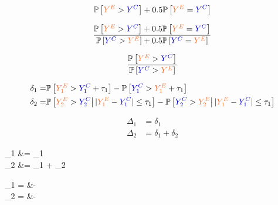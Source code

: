 \documentclass[12pt]{article}
\theoremstyle{definition}
\newcommand{\darkgreen}{green!70!black}
\newcommand{\darkblue}{blue!80!black}
\begin{document}
\begin{align*}
	\mathbb{P}\left[\textcolor{Orange}{Y^E}>\textcolor{\darkblue}{Y^C}\right]+0.5\mathbb{P}\left[\textcolor{Orange}{Y^E}=\textcolor{\darkblue}{Y^C}\right]
\end{align*}

\begin{align*}
	\frac{\mathbb{P}\left[\textcolor{Orange}{Y^E}>\textcolor{\darkblue}{Y^C}\right]+0.5\mathbb{P}\left[\textcolor{Orange}{Y^E}=\textcolor{\darkblue}{Y^C}\right]}{
	\mathbb{P}\left[\textcolor{\darkblue}{Y^C}>\textcolor{Orange}{Y^E}\right]+0.5\mathbb{P}\left[\textcolor{\darkblue}{Y^C}=\textcolor{Orange}{Y^E}\right]}
\end{align*}

\begin{align*}
	\frac{\mathbb{P}\left[\textcolor{Orange}{Y^E}>\textcolor{\darkblue}{Y^C}\right]}{\mathbb{P}\left[\textcolor{\darkblue}{Y^C}>\textcolor{Orange}{Y^E}\right]}
\end{align*}


\begin{align*}
	\delta_1 = &\mathbb{P}\left[\textcolor{Orange}{Y_1^E}>\textcolor{\darkblue}{Y_1^C}+\tau_1\right]-\mathbb{P}\left[\textcolor{\darkblue}{Y_1^C}>\textcolor{Orange}{Y_1^E}+\tau_1\right] \\
	\delta_2 = &\mathbb{P}\left[\textcolor{Orange}{Y_2^E}>\textcolor{\darkblue}{Y_2^C}\big| \, |\textcolor{Orange}{Y_1^E}-\textcolor{\darkblue}{Y_1^C}| \leq \tau_1\right]-\mathbb{P}\left[\textcolor{\darkblue}{Y_2^C}>\textcolor{Orange}{Y_2^E}\big| \, |\textcolor{Orange}{Y_1^E}-\textcolor{\darkblue}{Y_1^C}| \leq \tau_1\right] 
\end{align*}



\begin{align*}
	\Delta_1 &= \delta_1 \\
		\Delta_2 &= \delta_1 + \delta_2
\end{align*}

\begin{minipage}{3.5cm}
\begin{tcolorbox}[ams align*, colback=white, colframe=\darkgreen]
	\Delta_1 &= \delta_1 \\
	\Delta_2 &= \delta_1 + \delta_2
\end{tcolorbox}
\end{minipage}

\bigskip

\begin{minipage}{14cm}
	\begin{tcolorbox}[ams align*, colback=white, colframe=colour_pink]
	\delta_1 = &\left[\textcolor{Orange}{Y_1^E}>\textcolor{\darkblue}{Y_1^C}+\tau_1\right]-\left[\textcolor{\darkblue}{Y_1^C}>\textcolor{Orange}{Y_1^E}+\tau_1\right] \\
	\delta_2 = &\left[\textcolor{Orange}{Y_2^E}>\textcolor{\darkblue}{Y_2^C}\big| \, |\textcolor{Orange}{Y_1^E}-\textcolor{\darkblue}{Y_1^C}| \leq \tau_1\right]-\left[\textcolor{\darkblue}{Y_2^C}>\textcolor{Orange}{Y_2^E}\big| \, |\textcolor{Orange}{Y_1^E}-\textcolor{\darkblue}{Y_1^C}| \leq \tau_1\right] 
	\end{tcolorbox}
\end{minipage}
\end{document}
